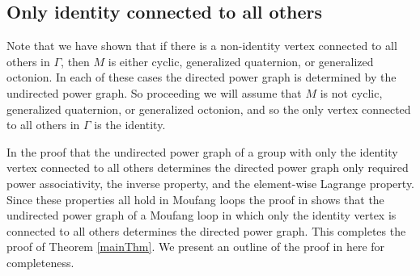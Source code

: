 \documentclass[12pt, twoside, openright]{report}
\theoremstyle{definition}
\begin{document}
\subsection{Only identity connected to all others}

  Note that we have shown that if there is a non-identity vertex connected to all others in $\Gamma$,
    then $M$ is either cyclic, generalized quaternion, or generalized octonion. In each of these
    cases the directed power graph is determined by the undirected power graph. So proceeding we will
    assume that $M$ is not cyclic, generalized quaternion, or generalized octonion, and so the only
    vertex connected to all others in $\Gamma$ is the identity.

  In \cite{PGII} the proof that the undirected power graph of a group with only the identity vertex
    connected to all others determines the directed power graph only required power associativity,
    the inverse property, and the element-wise Lagrange property. Since these properties all hold in
    Moufang loops the proof in \cite{PGII} shows that the undirected power graph of a Moufang loop in
    which only the identity vertex is connected to all others determines the directed power graph.
    This completes the proof of Theorem \ref{mainThm}. We present an outline of the proof in
    \cite{PGII} here for completeness.
\end{document}

